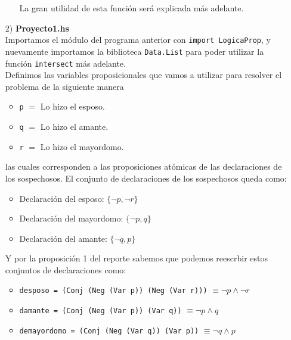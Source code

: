 \documentclass[letterpaper,12pt]{article}
\begin{document}
\begin{itemize}
\begin{itemize}
            La gran utilidad de esta función será explicada más adelante.
        \end{itemize}

        \item[2)] \textbf{Proyecto1.hs} \\
        Importamos el módulo del programa anterior con 
        \texttt{import LogicaProp}, y nuevamente importamos la biblioteca 
        \texttt{Data.List} para poder utilizar la función \texttt{intersect}
        más adelante. \\
        Definimos las variables proposicionales que vamos a utilizar para 
        resolver el problema de la siguiente manera
        \begin{itemize}
            \item \texttt{p} $=$ Lo hizo el esposo.
            \item \texttt{q} $=$ Lo hizo el amante.
            \item \texttt{r} $=$ Lo hizo el mayordomo.
        \end{itemize}

        las cuales corresponden a las proposiciones atómicas de las 
        declaraciones de los sospechosos. El conjunto de declaraciones 
        de los sospechosos queda como: 
        \begin{itemize}
            \item Declaración del esposo: $\{ \neg p, \neg r \}$
            \item Declaración del mayordomo: $\{ \neg p, q \}$
            \item Declaración del amante: $\{\neg q, p \}$
        \end{itemize}

        Y por la proposición 1 del reporte sabemos que podemos reescrbir
        estos conjuntos de declaraciones como:

        \begin{itemize}
            \item \texttt{desposo = (Conj (Neg (Var p)) (Neg (Var r)))}
            $\equiv \neg p \land \neg r$
            \item \texttt{damante = (Conj (Neg (Var p)) (Var q))}
            $\equiv \neg p \land q$
            \item \texttt{demayordomo = (Conj (Neg (Var q)) (Var p))}
            $\equiv \neg q \land p$
        \end{itemize}


\end{itemize}
\end{document}

